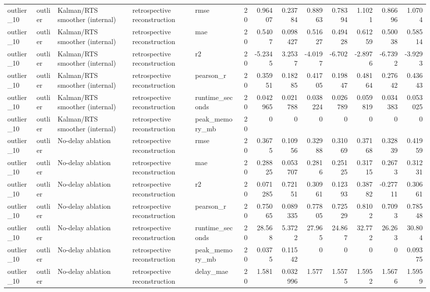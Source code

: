 \begin{table}[!htbp]
{{\begin{tabular}{lllllrrrrrrrr}
outlier_10 & outlier & Kalman/RTS smoother (internal) & retrospective reconstruction & rmse & 20 & 0.96407 & 0.23784 & 0.88963 & 0.78394 & 1.1021 & 0.86696 & 1.0704 \\
outlier_10 & outlier & Kalman/RTS smoother (internal) & retrospective reconstruction & mae & 20 & 0.5407 & 0.098427 & 0.51627 & 0.49428 & 0.61259 & 0.50038 & 0.58514 \\
outlier_10 & outlier & Kalman/RTS smoother (internal) & retrospective reconstruction & r2 & 20 & -5.2345 & 3.2537 & -4.0197 & -6.702 & -2.8976 & -6.7392 & -3.9293 \\
outlier_10 & outlier & Kalman/RTS smoother (internal) & retrospective reconstruction & pearson_r & 20 & 0.35951 & 0.18285 & 0.41705 & 0.19847 & 0.48164 & 0.27642 & 0.43643 \\
outlier_10 & outlier & Kalman/RTS smoother (internal) & retrospective reconstruction & runtime_seconds & 20 & 0.042965 & 0.021788 & 0.038224 & 0.026789 & 0.059819 & 0.034383 & 0.053025 \\
outlier_10 & outlier & Kalman/RTS smoother (internal) & retrospective reconstruction & peak_memory_mb & 20 & 0 & 0 & 0 & 0 & 0 & 0 & 0 \\
outlier_10 & outlier & No-delay ablation & retrospective reconstruction & rmse & 20 & 0.3675 & 0.10956 & 0.32988 & 0.31069 & 0.37168 & 0.32839 & 0.41959 \\
outlier_10 & outlier & No-delay ablation & retrospective reconstruction & mae & 20 & 0.28825 & 0.053707 & 0.2816 & 0.25125 & 0.31715 & 0.2673 & 0.31231 \\
outlier_10 & outlier & No-delay ablation & retrospective reconstruction & r2 & 20 & 0.071285 & 0.72151 & 0.30961 & 0.12393 & 0.38782 & -0.27711 & 0.30661 \\
outlier_10 & outlier & No-delay ablation & retrospective reconstruction & pearson_r & 20 & 0.75065 & 0.089335 & 0.77805 & 0.72529 & 0.8102 & 0.7093 & 0.78548 \\
outlier_10 & outlier & No-delay ablation & retrospective reconstruction & runtime_seconds & 20 & 28.568 & 5.3722 & 27.965 & 24.867 & 32.772 & 26.263 & 30.804 \\
outlier_10 & outlier & No-delay ablation & retrospective reconstruction & peak_memory_mb & 20 & 0.0375 & 0.11542 & 0 & 0 & 0 & 0 & 0.09375 \\
outlier_10 & outlier & No-delay ablation & retrospective reconstruction & delay_mae & 20 & 1.581 & 0.032996 & 1.577 & 1.5575 & 1.5952 & 1.5676 & 1.5959 \\

\end{tabular}}}
\end{table}
